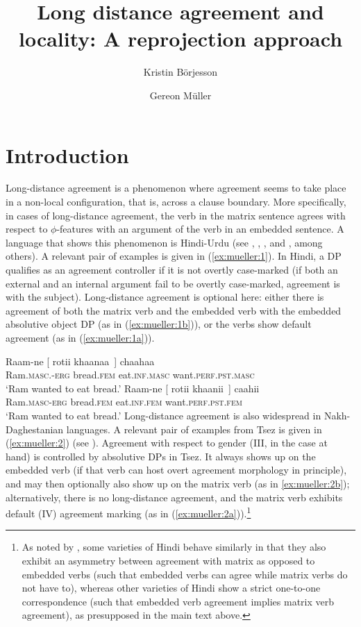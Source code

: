 \documentclass[output=paper
,modfonts
,nonflat]{langsci/langscibook}
\title{Long distance agreement and locality: A reprojection approach}
\author{Kristin Börjesson\affiliation{Universität Leipzig}\and Gereon Müller\affiliation{Universität Leipzig}}
\begin{document}
	
	\maketitle
	
	\newcommand{\refprefix}{ex:mueller:}
	\section{Introduction} \label{sec-bjoe-muel:1}
	
	Long-distance agreement is a phenomenon where agreement seems to take
	place in a non-local configuration, that is, across a clause boundary.
	More specifically, in cases of long-distance agreement, the verb in
	the matrix sentence agrees with respect to $\phi$-features with an
	argument of the verb in an embedded sentence. A language that shows
	this phenomenon is Hindi-Urdu (see \citealt{Mahajan:90},
	\citealt{Butt:95,Butt:08}, \citealt{Bhatt:05}, and \citealt{Chandra:05}, among
	others). A relevant pair of examples is given in (\ref{ex:mueller:1}). In Hindi, a DP
	qualifies as an agreement controller if it is not overtly case-marked (if
	both an external and an internal argument fail to be overtly
	case-marked, agreement is with the subject). Long-distance agreement
	is optional here: either there is agreement of both the matrix verb
	and the embedded verb with the embedded absolutive object DP (as in
	(\ref{ex:mueller:1b})), or the verbs show default agreement (as in (\ref{ex:mueller:1a})).
	
	\ea\label{ex:mueller:1}
	\ea \label{ex:mueller:1a}
	\gll  Raam-ne [\sub{$\alpha$} rotii khaanaa~] chaahaa \\ 
	Ram.{\scshape masc}.-{\scshape erg} {} bread.{\scshape fem} eat.{\scshape inf}.{\scshape masc} want.{\scshape perf.pst.masc} \\ 
	\glt  `Ram wanted to eat bread.'
	\ex \label{ex:mueller:1b}
	\gll Raam-ne [\sub{$\alpha$} rotii khaanii~] caahii \\ 
	Ram.{\scshape masc}-{\scshape erg} {} bread.{\scshape fem} eat.{\scshape inf}.{\scshape fem} want.{\scshape perf.pst.fem} \\ 
	\glt `Ram wanted to eat bread.'
	\z
	\z
	Long-distance agreement is also widespread in Nakh-Daghestanian
	languages. A relevant pair of examples from Tsez is given in (\ref{ex:mueller:2})
	(see \citealt{PolinskyPotsdam:01}). Agreement with respect to gender
	(III, in the case at hand) is controlled by
	absolutive DPs in Tsez. It always shows up on the embedded verb (if
	that verb can host overt agreement morphology in principle), and may
	then optionally also show up on the matrix verb (as in \ref{ex:mueller:2b});
	alternatively, there is no long-distance agreement, and the matrix
	verb exhibits default (IV) agreement marking (as in (\ref{ex:mueller:2a})).\footnote{As
		noted by \citet{Bhatt:05}, some varieties of Hindi behave similarly
		in that they also exhibit an asymmetry between agreement with matrix
		as opposed to embedded verbs (such that embedded verbs can agree
		while matrix verbs do not have to), whereas other varieties of Hindi show a
		strict one-to-one correspondence (such that embedded verb agreement
		implies matrix verb agreement), as presupposed in the main text above.}
\end{document}
